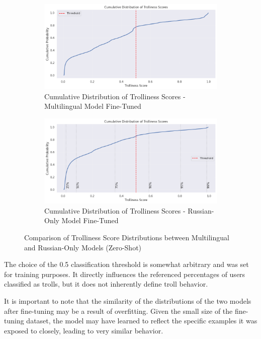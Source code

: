 \documentclass[twoside]{ctuthesis}
\theoremstyle{plain}
\theoremstyle{definition}
\theoremstyle{note}
\begin{document}
\begin{figure}[h]
  \centering
  \begin{subfigure}{0.49\textwidth}
    \includegraphics[width=\linewidth]{figures/cumulative_mult.png}
    \caption{Cumulative Distribution of Trolliness Scores - Multilingual Model Fine-Tuned}
    \label{fig:cumulative_mult}
  \end{subfigure}
  \hfill
  \begin{subfigure}{0.49\textwidth}
    \includegraphics[width=\linewidth]{figures/cumulative_ru.png}
    \caption{Cumulative Distribution of Trolliness Scores - Russian-Only Model Fine-Tuned}
    \label{fig:cumulative_ru}
  \end{subfigure}
  \caption{Comparison of Trolliness Score Distributions between Multilingual and Russian-Only Models (Zero-Shot)}
  \label{fig:cumulative_comparison_finetuned}
\end{figure}

The choice of the 0.5 classification threshold is somewhat arbitrary and was set for training purposes. It directly influences the referenced percentages of users classified as trolls, but it does not inherently define troll behavior.\par
It is important to note that the similarity of the distributions of the two models after fine-tuning may be a result of overfitting. Given the small size of the fine-tuning dataset, the model may have learned to reflect the specific examples it was exposed to closely, leading to very similar behavior.\par
\end{document}
